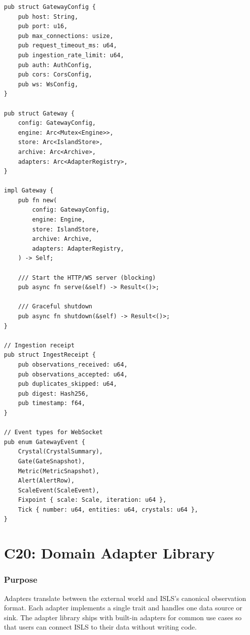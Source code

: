 \documentclass[11pt,a4paper,twoside]{article}
\theoremstyle{definition}
\theoremstyle{plain}
\theoremstyle{remark}
\newcommand{\ISLS}{\textsf{ISLS}}
\begin{document}
\begin{lstlisting}[title={isls-gateway/src/lib.rs}]
pub struct GatewayConfig {
    pub host: String,
    pub port: u16,
    pub max_connections: usize,
    pub request_timeout_ms: u64,
    pub ingestion_rate_limit: u64,
    pub auth: AuthConfig,
    pub cors: CorsConfig,
    pub ws: WsConfig,
}

pub struct Gateway {
    config: GatewayConfig,
    engine: Arc<Mutex<Engine>>,
    store: Arc<IslandStore>,
    archive: Arc<Archive>,
    adapters: Arc<AdapterRegistry>,
}

impl Gateway {
    pub fn new(
        config: GatewayConfig,
        engine: Engine,
        store: IslandStore,
        archive: Archive,
        adapters: AdapterRegistry,
    ) -> Self;

    /// Start the HTTP/WS server (blocking)
    pub async fn serve(&self) -> Result<()>;

    /// Graceful shutdown
    pub async fn shutdown(&self) -> Result<()>;
}

// Ingestion receipt
pub struct IngestReceipt {
    pub observations_received: u64,
    pub observations_accepted: u64,
    pub duplicates_skipped: u64,
    pub digest: Hash256,
    pub timestamp: f64,
}

// Event types for WebSocket
pub enum GatewayEvent {
    Crystal(CrystalSummary),
    Gate(GateSnapshot),
    Metric(MetricSnapshot),
    Alert(AlertRow),
    ScaleEvent(ScaleEvent),
    Fixpoint { scale: Scale, iteration: u64 },
    Tick { number: u64, entities: u64, crystals: u64 },
}
\end{lstlisting}


\part{C20: Domain Adapter Library}\label{part:adapters}

\section{Purpose}\label{sec:ad:purpose}

Adapters translate between the external world and \ISLS{}'s canonical
observation format. Each adapter implements a single trait and handles
one data source or sink. The adapter library ships with built-in
adapters for common use cases so that users can connect \ISLS{} to
their data without writing code.
\end{document}
